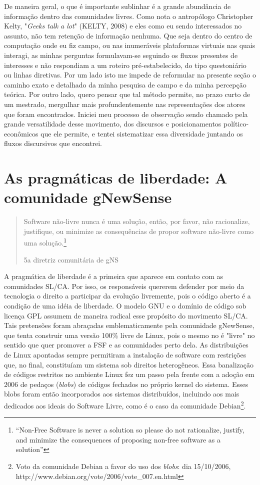 De maneira geral, o que é importante sublinhar é a grande abundância de informaç\~ao dentro das comunidades livres. Como nota o antrop\'ologo Christopher Kelty, "\emph{Geeks talk a lot}" (KELTY, 2008) e eles como eu sendo interessados no assunto, n\~ao tem retenç\~ao de informaç\~ao nenhuma. Que seja dentro do centro de computaç\~ao onde eu fiz campo, ou nas inumer\'aveis plataformas virtuais nas quais interagi, as minhas perguntas formulavam-se seguindo os fluxos presentes de interesses e n\~ao respondiam a um roteiro pré-estabelecido, do tipo questoni\'ario ou linhas diretivas. Por um lado isto me impede de reformular na presente seç\~ao o caminho exato e detalhado da minha pesquisa de campo e da minha percepç\~ao te\'orica. Por outro lado, quero pensar que tal m\'etodo permite, no prazo curto de um mestrado, mergulhar mais profundentemente nas representaç\~oes dos atores que foram encontrados. Iniciei meu processo de observaç\~ao sendo chamado pela grande versatilidade desse movimento, dos discursos e posicionamentos pol\'itico-econ\^omicos que ele permite, e tentei sistematizar essa diversidade juntando os fluxos discursivos que encontrei.


\section{As pragmáticas de liberdade: A comunidade gNewSense} \label{3.2}

\begin{quote}
Software não-livre nunca é uma solução, então, por favor, não racionalize, justifique, ou minimize as consequências de propor software não-livre como uma solução.\footnote{“Non-Free Software is never a solution so please do not rationalize, justify, and minimize the consequences of proposing non-free software as a solution”}
\begin{flushright}
5a diretriz comunitária de gNS
\end{flushright}
\end{quote}

A pragmática de liberdade é a primeira que aparece em contato com as comunidades SL/CA. Por isso, os responsáveis quererem defender por meio da tecnologia o direito a participar da evolução livremente, pois o código aberto é a condição de uma idéia de liberdade. O modelo GNU e o domínio de código sob licença GPL assumem de maneira radical esse propósito do movimento SL/CA. Tais pretensões foram abraçadas emblematicamente pela comunidade gNewSense, que tenta construir uma versão 100\% livre de Linux, pois o mesmo no é "livre" no sentido que quer promover a FSF e as comunidades perto dela. As distribuições de Linux apontadas sempre permitiram a instalação de software com restrições que, no final, constituíam um sistema sob direitos heterogêneos. Essa banalização de códigos restritos no ambiente Linux fez um passo pela frente com a adoção em 2006 de pedaços (\emph{blobs}) de códigos fechados no próprio kernel do sistema. Esses blobs foram então incorporados aos sistemas distribuídos, incluindo aos mais dedicados aos ideais do Software Livre, como é o caso da comunidade Debian\footnote{Voto da comunidade Debian a favor do uso dos \emph{blobs}: dia 15/10/2006, http://www.debian.org/vote/2006/vote\_007.en.html}. 

